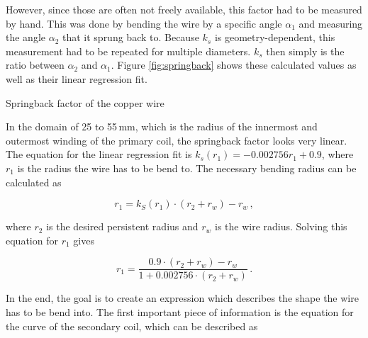 However, since those are often not freely available, this factor had to be measured by hand. This was done by bending the wire by a specific angle \(\alpha_1\) and measuring the angle \(\alpha_2\) that it sprung back to. Because \(k_s\) is geometry-dependent, this measurement had to be repeated for multiple diameters. \(k_s\) then simply is the ratio between \(\alpha_2\) and \(\alpha_1\). Figure \ref{fig:springback} shows these calculated values as well as their linear regression fit.

\begin{marginfigure}[-1cm]
    \centering
    \caption{Springback factor of the copper wire}
    \label{fig:springback}
\end{marginfigure}

In the domain of 25 to 55\,mm, which is the radius of the innermost and outermost winding of the primary coil, the springback factor looks very linear. The equation for the linear regression fit is \(k_s(r_1) = -0.002756 r_1 + 0.9\), where \(r_1\) is the radius the wire has to be bend to. The necessary bending radius can be calculated as

\begin{equation}
    r_1 = k_S(r_1) \cdot \left(r_2 + r_w\right) - r_w\,,
\end{equation}

where \(r_2\) is the desired persistent radius and \(r_w\) is the wire radius. Solving this equation for \(r_1\) gives

\begin{equation}\label{eq:r1-overbending}
    r_1 = \frac{0.9 \cdot \left( r_2 + r_w \right) - r_w}{1 + 0.002756 \cdot \left(r_2 + r_w\right)}\,.
\end{equation}

In the end, the goal is to create an expression which describes the shape the wire has to be bend into. The first important piece of information is the equation for the curve of the secondary coil, which can be described as

